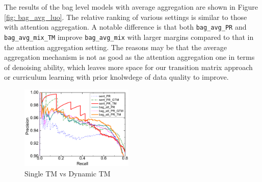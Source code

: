 The results of the bag level models with average aggregation are shown in Figure \ref{fig: bag_avg_luo}. The relative ranking of various settings is similar to those with attention aggregation.
A notable difference is that both \texttt{bag\_avg\_PR} and \texttt{bag\_avg\_mix\_TM} improve \texttt{bag\_avg\_mix} with larger margins compared to that in the attention aggregation setting. The reasons may be that the average aggregation mechanism is not as good as the attention aggregation one in terms of denoising ability, which leaves more space for our transition matrix approach or curriculum learning with prior knolwdege of data quality to improve.

\begin{figure}[htbp]
\begin{center}
\includegraphics[width=0.48\textwidth]{figures/single_cmp_exp_overall.pdf}
\caption{Single TM vs Dynamic TM}
\label{fig: cmp_single_dynamic}
\end{center}
\end{figure}

